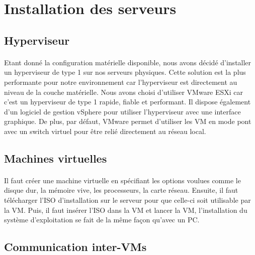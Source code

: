 \section{Installation des serveurs}
	\subsection{Hyperviseur}
		\paragraph{}
			Etant donné la configuration matérielle disponible, nous avons décidé d’installer un hyperviseur de type 1 sur nos serveurs physiques. Cette solution est la plus performante pour notre environnement car l’hyperviseur est directement au niveau de la couche matérielle. Nous avons choisi d’utiliser VMware ESXi car c’est un hyperviseur de type 1 rapide, fiable et performant. Il dispose également d’un logiciel de gestion vSphere pour utiliser l’hyperviseur avec une interface graphique. De plus, par défaut, VMware permet d’utiliser les VM en mode pont avec un switch virtuel pour être relié directement au réseau local.

	\subsection{Machines virtuelles}
		\paragraph{}
			Il faut créer une machine virtuelle en spécifiant les options voulues comme le disque dur, la mémoire vive, les processeurs, la carte réseau. Ensuite, il faut télécharger l’ISO d’installation sur le serveur pour que celle-ci soit utilisable par la VM. Puis, il faut insérer l’ISO dans la VM et lancer la VM, l’installation du système d’exploitation se fait de la même façon qu’avec un PC. 

	\subsection{Communication inter-VMs}

